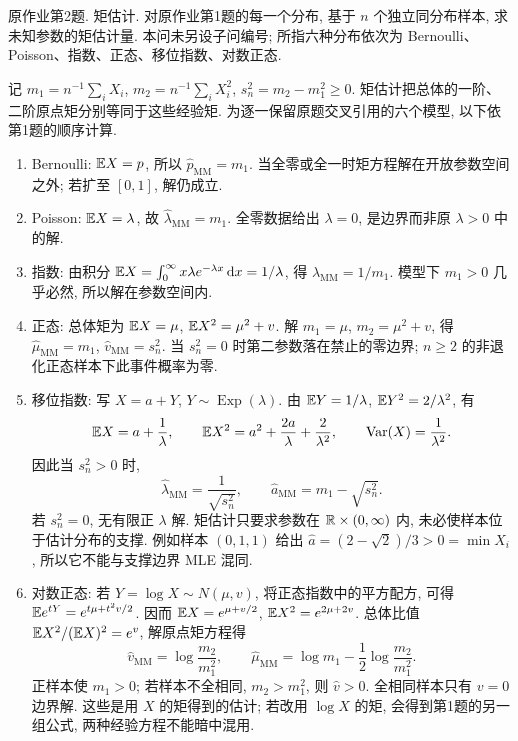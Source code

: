 \begin{exercise}\label{ps04:p02}
原作业第2题. 矩估计. 对原作业第1题的每一个分布, 基于 $n$ 个独立同分布样本, 求未知参数的矩估计量. 本问未另设子问编号; 所指六种分布依次为 Bernoulli、Poisson、指数、正态、移位指数、对数正态.
\end{exercise}
\begin{solution}
记 $m_1=n^{-1}\sum_iX_i$, $m_2=n^{-1}\sum_iX_i^2$, $s_n^2=m_2-m_1^2\ge0$. 矩估计把总体的一阶、二阶原点矩分别等同于这些经验矩. 为逐一保留原题交叉引用的六个模型, 以下依第1题的顺序计算.
\begin{enumerate}[label=\arabic*.]
\item Bernoulli: $\mathbb E X=p$, 所以 $\hat p_{\mathrm{MM}}=m_1$. 当全零或全一时矩方程解在开放参数空间之外; 若扩至 $[0,1]$, 解仍成立.
\item Poisson: $\mathbb E X=\lambda$, 故 $\hat\lambda_{\mathrm{MM}}=m_1$. 全零数据给出 $\lambda=0$, 是边界而非原 $\lambda>0$ 中的解.
\item 指数: 由积分 $\mathbb E X=\int_0^\infty x\lambda e^{-\lambda x}\,\mathrm d x=1/\lambda$, 得 $\hat\lambda_{\mathrm{MM}}=1/m_1$. 模型下 $m_1>0$ 几乎必然, 所以解在参数空间内.
\item 正态: 总体矩为 $\mathbb E X=\mu$, $\mathbb E X^2=\mu^2+v$. 解 $m_1=\mu$, $m_2=\mu^2+v$, 得 $\hat\mu_{\mathrm{MM}}=m_1$, $\hat v_{\mathrm{MM}}=s_n^2$. 当 $s_n^2=0$ 时第二参数落在禁止的零边界; $n\ge2$ 的非退化正态样本下此事件概率为零.
\item 移位指数: 写 $X=a+Y$, $Y\sim\operatorname{Exp}(\lambda)$. 由 $\mathbb E Y=1/\lambda$, $\mathbb E Y^2=2/\lambda^2$, 有
\[
\mathbb E X=a+\frac1\lambda,\qquad
\mathbb E X^2=a^2+\frac{2a}\lambda+\frac2{\lambda^2},\qquad
\operatorname{Var}(X)=\frac1{\lambda^2}.
\]
因此当 $s_n^2>0$ 时,
\[
\hat\lambda_{\mathrm{MM}}=\frac1{\sqrt{s_n^2}},\qquad
\hat a_{\mathrm{MM}}=m_1-\sqrt{s_n^2}.
\]
若 $s_n^2=0$, 无有限正 $\lambda$ 解. 矩估计只要求参数在 $\mathbb R\times(0,\infty)$ 内, 未必使样本位于估计分布的支撑. 例如样本 $(0,1,1)$ 给出 $\hat a=(2-\sqrt2)/3>0=\min X_i$, 所以它不能与支撑边界 MLE 混同.
\item 对数正态: 若 $Y=\log X\sim N(\mu,v)$, 将正态指数中的平方配方, 可得 $\mathbb E e^{tY}=e^{t\mu+t^2v/2}$. 因而 $\mathbb E X=e^{\mu+v/2}$, $\mathbb E X^2=e^{2\mu+2v}$. 总体比值 $\mathbb E X^2/(\mathbb E X)^2=e^v$, 解原点矩方程得
\[
\hat v_{\mathrm{MM}}=\log\frac{m_2}{m_1^2},\qquad
\hat\mu_{\mathrm{MM}}=\log m_1-\frac12\log\frac{m_2}{m_1^2}.
\]
正样本使 $m_1>0$; 若样本不全相同, $m_2>m_1^2$, 则 $\hat v>0$. 全相同样本只有 $v=0$ 边界解. 这些是用 $X$ 的矩得到的估计; 若改用 $\log X$ 的矩, 会得到第1题的另一组公式, 两种经验方程不能暗中混用.
\end{enumerate}
\end{solution}

